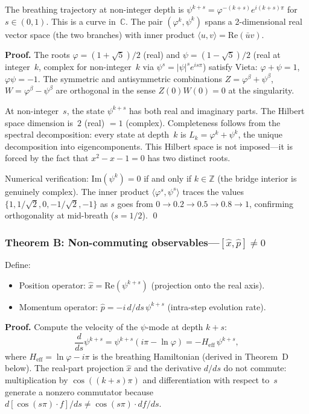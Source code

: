 \documentclass[12pt,a4paper]{article}
\begin{document}
The breathing trajectory at non-integer depth is $\psi^{k+s} = \varphi^{-(k+s)} e^{i(k+s)\pi}$ for $s \in (0,1)$. This is a curve in~$\mathbb{C}$. The pair $(\varphi^k, \psi^k)$ spans a 2-dimensional real vector space (the two branches) with inner product $\langle u, v \rangle = \mathrm{Re}(\bar{u}v)$.

\textbf{Proof.} The roots $\varphi = (1+\sqrt{5})/2$ (real) and $\psi = (1-\sqrt{5})/2$ (real at integer~$k$, complex for non-integer~$k$ via $\psi^s = |\psi|^s e^{is\pi}$) satisfy Vieta: $\varphi + \psi = 1$, $\varphi\psi = -1$. The symmetric and antisymmetric combinations $Z = \varphi^\beta + \psi^\beta$, $W = \varphi^\beta - \psi^\beta$ are orthogonal in the sense $Z(0)W(0) = 0$ at the singularity.

At non-integer~$s$, the state $\psi^{k+s}$ has both real and imaginary parts. The Hilbert space dimension is~$2$ (real) $= 1$ (complex). Completeness follows from the spectral decomposition: every state at depth~$k$ is $L_k = \varphi^k + \psi^k$, the unique decomposition into eigencomponents. This Hilbert space is not imposed---it is forced by the fact that $x^2 - x - 1 = 0$ has two distinct roots.

Numerical verification: $\mathrm{Im}(\psi^k) = 0$ if and only if $k \in \mathbb{Z}$ (the bridge interior is genuinely complex). The inner product $\langle \varphi^s, \psi^s \rangle$ traces the values $\{1, 1/\sqrt{2}, 0, -1/\sqrt{2}, -1\}$ as $s$ goes from $0 \to 0.2 \to 0.5 \to 0.8 \to 1$, confirming orthogonality at mid-breath ($s = 1/2$). \qed

\subsubsection{Theorem B: Non-commuting observables---$[\hat{x}, \hat{p}] \neq 0$}

Define:
\begin{itemize}[nosep]
\item Position operator: $\hat{x} = \mathrm{Re}(\psi^{k+s})$ (projection onto the real axis).
\item Momentum operator: $\hat{p} = -i \, d/ds \, \psi^{k+s}$ (intra-step evolution rate).
\end{itemize}

\textbf{Proof.} Compute the velocity of the $\psi$-mode at depth $k+s$:
\begin{equation}
\frac{d}{ds}\psi^{k+s} = \psi^{k+s}(i\pi - \ln\varphi) = -H_{\mathrm{eff}} \, \psi^{k+s},
\end{equation}
where $H_{\mathrm{eff}} = \ln\varphi - i\pi$ is the breathing Hamiltonian (derived in Theorem~D below). The real-part projection $\hat{x}$ and the derivative $d/ds$ do not commute: multiplication by $\cos((k{+}s)\pi)$ and differentiation with respect to~$s$ generate a nonzero commutator because $d[\cos(s\pi) \cdot f]/ds \neq \cos(s\pi) \cdot df/ds$.
\end{document}
